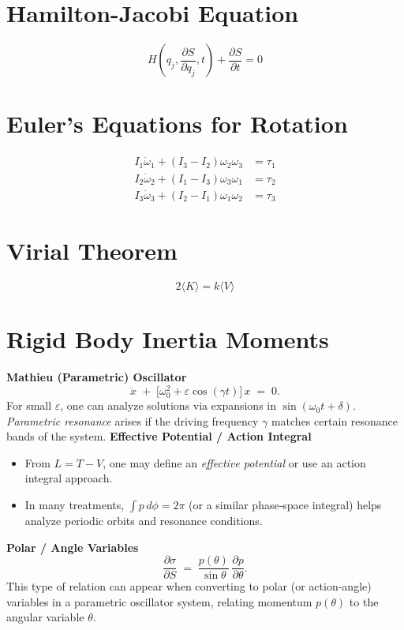 \documentclass{article}
\begin{document}
\section{Hamilton-Jacobi Equation}
\begin{equation}
    H(q_j, \frac{\partial S}{\partial q_j}, t) + \frac{\partial S}{\partial t} = 0
\end{equation}

\section{Euler’s Equations for Rotation}
\begin{align}
    I_1 \dot{\omega}_1 + (I_3 - I_2) \omega_2 \omega_3 &= \tau_1 \\
    I_2 \dot{\omega}_2 + (I_1 - I_3) \omega_3 \omega_1 &= \tau_2 \\
    I_3 \dot{\omega}_3 + (I_2 - I_1) \omega_1 \omega_2 &= \tau_3
\end{align}

\section{Virial Theorem}
\begin{equation}
    2 \langle K \rangle = k \langle V \rangle
\end{equation}

\section{Rigid Body Inertia Moments}

\textbf{Mathieu (Parametric) Oscillator}
\[
\ddot{x} \;+\;\bigl[\omega_0^2 + \varepsilon \cos(\gamma t)\bigr]\,x \;=\; 0.
\]
For small \(\varepsilon\), one can analyze solutions via expansions in \(\sin(\omega_0 t+\delta)\).
\emph{Parametric resonance} arises if the driving frequency \(\gamma\) matches certain resonance bands of the system.
\textbf{Effective Potential / Action Integral}
\begin{itemize}
\item From \(L = T - V\), one may define an \emph{effective potential} or use an action integral approach.
\item In many treatments, \(\int p\, d\phi = 2\pi\) (or a similar phase‐space integral) helps analyze periodic orbits and resonance conditions.
\end{itemize}

\vspace{0.5em}
\textbf{Polar / Angle Variables}
\[
\frac{\partial \sigma}{\partial S}
\;=\;
\frac{p(\theta)}{\sin\theta}
\,\frac{\partial p}{\partial \theta}.
\]
This type of relation can appear when converting to polar (or action‐angle) variables in a parametric oscillator system, relating momentum \(p(\theta)\) to the angular variable \(\theta\).
\end{document}
